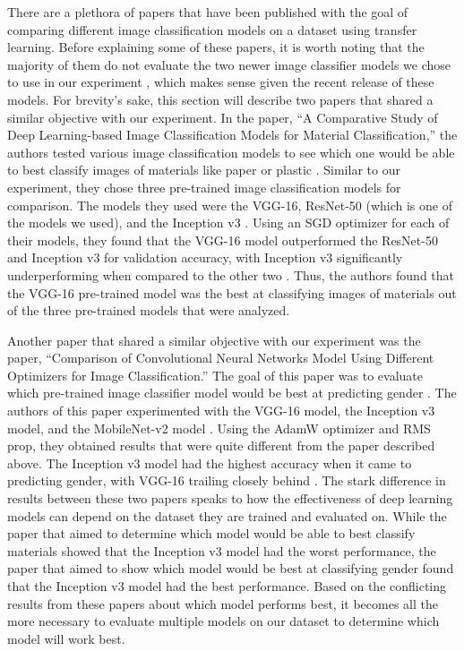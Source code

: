 \documentclass{article}
\begin{document}
There are a plethora of papers that have been published with the goal of comparing different image classification models on a dataset using transfer learning. Before explaining some of these papers, it is worth noting that the majority of them do not evaluate the two newer image classifier models we chose to use in our experiment \parencite{vit, cvt}, which makes sense given the recent release of these models. For brevity’s sake, this section will describe two papers that shared a similar objective with our experiment. In the paper, “A Comparative Study of Deep Learning-based Image Classification Models for Material Classification,” the authors tested various image classification models to see which one would be able to best classify images of materials like paper or plastic \parencite{Gokhale}. Similar to our experiment, they chose three pre-trained image classification models for comparison. The models they used were the VGG-16, ResNet-50 (which is one of the models we used), and the Inception v3 \parencite{Gokhale}. Using an SGD optimizer for each of their models, they found that the VGG-16 model outperformed the ResNet-50 and Inception v3 for validation accuracy, with Inception v3 significantly underperforming when compared to the other two \parencite{Gokhale}. Thus, the authors found that the VGG-16 pre-trained model was the best at classifying images of materials out of the three pre-trained models that were analyzed.

Another paper that shared a similar objective with our experiment was the paper, “Comparison of Convolutional Neural Networks Model Using Different Optimizers for Image Classification.” The goal of this paper was to evaluate which pre-trained image classifier model would be best at predicting gender \parencite{Wirayasa}. The authors of this paper experimented with the VGG-16 model, the Inception v3 model, and the MobileNet-v2 model \parencite{Wirayasa}. Using the AdamW optimizer and RMS prop, they obtained results that were quite different from the paper described above. The Inception v3 model had the highest accuracy when it came to predicting gender, with VGG-16 trailing closely behind \parencite{Wirayasa}. The stark difference in results between these two papers speaks to how the effectiveness of deep learning models can depend on the dataset they are trained and evaluated on. While the paper that aimed to determine which model would be able to best classify materials showed that the Inception v3 model had the worst performance, the paper that aimed to show which model would be best at classifying gender found that the Inception v3 model had the best performance. Based on the conflicting results from these papers about which model performs best, it becomes all the more necessary to evaluate multiple models on our dataset to determine which model will work best.
\end{document}
